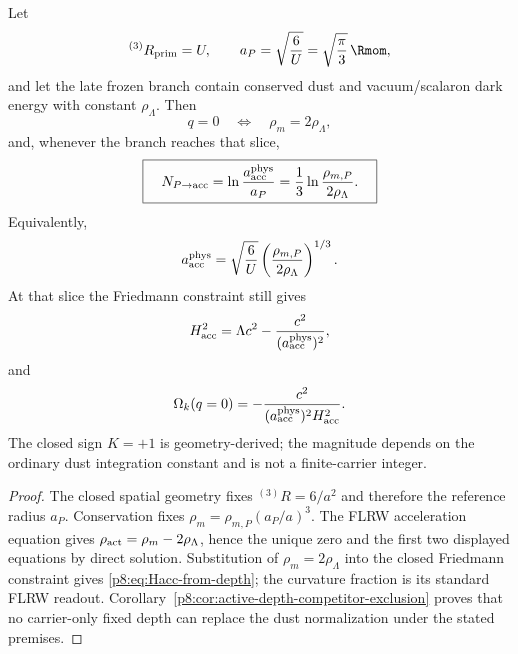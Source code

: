 \documentclass[12pt,a4paper]{article}
\begin{document}
\begin{theorem}
\label{p8:thm:q0-active-trace-depth}
Let
\[
{}^{(3)}R_{\rm prim}=U,\qquad a_P=\sqrt{\frac6U}=\sqrt{\frac\pi3}\,\Rmom,
\]
and let the late frozen branch contain conserved dust and vacuum/scalaron dark
energy with constant \(\rho_\Lambda\).  Then
\begin{equation}
\label{p8:eq:q0-active-trace-condition}
q=0\quad\Longleftrightarrow\quad\rho_m=2\rho_\Lambda,
\end{equation}
and, whenever the branch reaches that slice,
\begin{equation}
\label{p8:eq:curvature-depth-condition}
\boxed{\quad
N_{P\to{\rm acc}}
=\ln\frac{a^{\rm phys}_{\rm acc}}{a_P}
=\frac13\ln\frac{\rho_{m,P}}{2\rho_\Lambda}.\quad}
\end{equation}
Equivalently,
\begin{equation}
\label{p8:eq:acc-physical-radius-from-depth}
 a^{\rm phys}_{\rm acc}
 =\sqrt{\frac6U}
 \left(\frac{\rho_{m,P}}{2\rho_\Lambda}\right)^{1/3}.
\end{equation}
At that slice the Friedmann constraint still gives
\begin{equation}
\label{p8:eq:Hacc-from-depth}
H_{\rm acc}^2
=\Lambda c^2-\frac{c^2}{(a^{\rm phys}_{\rm acc})^2},
\end{equation}
and
\begin{equation}
\label{p8:eq:omega-k-acc}
\Omega_k(q=0)
=-\frac{c^2}{(a^{\rm phys}_{\rm acc})^2H_{\rm acc}^2}.
\end{equation}
The closed sign \(K=+1\) is geometry-derived; the magnitude depends on the
ordinary dust integration constant and is not a finite-carrier integer.
\end{theorem}

\begin{proof}
The closed spatial geometry fixes \({}^{(3)}R=6/a^2\) and therefore the
reference radius \(a_P\).  Conservation fixes
\(\rho_m=\rho_{m,P}(a_P/a)^3\).  The FLRW acceleration equation gives
\(\rho_{\rm act}=\rho_m-2\rho_\Lambda\), hence the unique zero and the first
two displayed equations by direct solution.  Substitution of
\(\rho_m=2\rho_\Lambda\) into the closed Friedmann constraint gives
\eqref{p8:eq:Hacc-from-depth}; the curvature fraction is its standard FLRW
readout.  Corollary~\ref{p8:cor:active-depth-competitor-exclusion} proves that
no carrier-only fixed depth can replace the dust normalization under the
stated premises.
\end{proof}
\end{document}
